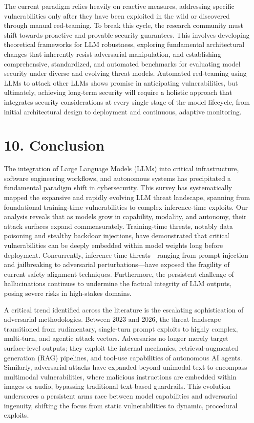 \documentclass[11pt,a4paper]{article}
\begin{document}
The current paradigm relies heavily on reactive measures, addressing specific vulnerabilities only after they have been exploited in the wild or discovered through manual red-teaming. To break this cycle, the research community must shift towards proactive and provable security guarantees. This involves developing theoretical frameworks for LLM robustness, exploring fundamental architectural changes that inherently resist adversarial manipulation, and establishing comprehensive, standardized, and automated benchmarks for evaluating model security under diverse and evolving threat models. Automated red-teaming using LLMs to attack other LLMs shows promise in anticipating vulnerabilities, but ultimately, achieving long-term security will require a holistic approach that integrates security considerations at every single stage of the model lifecycle, from initial architectural design to deployment and continuous, adaptive monitoring.

\section{10. Conclusion}

The integration of Large Language Models (LLMs) into critical infrastructure, software engineering workflows, and autonomous systems has precipitated a fundamental paradigm shift in cybersecurity. This survey has systematically mapped the expansive and rapidly evolving LLM threat landscape, spanning from foundational training-time vulnerabilities to complex inference-time exploits. Our analysis reveals that as models grow in capability, modality, and autonomy, their attack surfaces expand commensurately. Training-time threats, notably data poisoning and stealthy backdoor injections, have demonstrated that critical vulnerabilities can be deeply embedded within model weights long before deployment. Concurrently, inference-time threats---ranging from prompt injection and jailbreaking to adversarial perturbations---have exposed the fragility of current safety alignment techniques. Furthermore, the persistent challenge of hallucinations continues to undermine the factual integrity of LLM outputs, posing severe risks in high-stakes domains.

A critical trend identified across the literature is the escalating sophistication of adversarial methodologies. Between 2023 and 2026, the threat landscape transitioned from rudimentary, single-turn prompt exploits to highly complex, multi-turn, and agentic attack vectors. Adversaries no longer merely target surface-level outputs; they exploit the internal mechanics, retrieval-augmented generation (RAG) pipelines, and tool-use capabilities of autonomous AI agents. Similarly, adversarial attacks have expanded beyond unimodal text to encompass multimodal vulnerabilities, where malicious instructions are embedded within images or audio, bypassing traditional text-based guardrails. This evolution underscores a persistent arms race between model capabilities and adversarial ingenuity, shifting the focus from static vulnerabilities to dynamic, procedural exploits.
\end{document}
